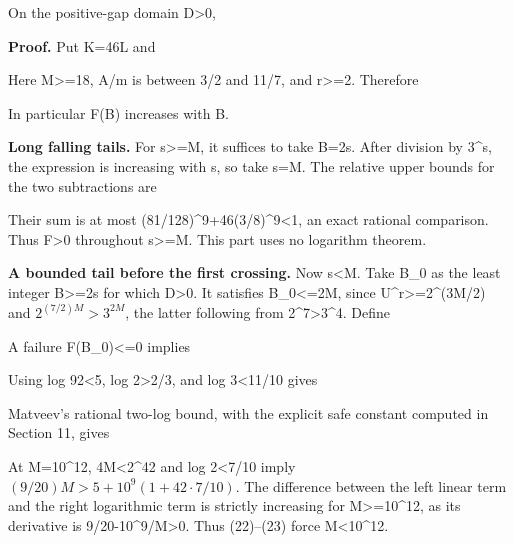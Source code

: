 On the positive-gap domain D\textgreater0,


\textbf{Proof.} Put K=46L and


Here M\textgreater=18, A/m is between 3/2 and 11/7, and r\textgreater=2.
Therefore


In particular F(B) increases with B.

\textbf{Long falling tails.} For s\textgreater=M, it suffices to take
B=2s. After division by 3\^{}s, the expression is increasing with s, so
take s=M. The relative upper bounds for the two subtractions are


Their sum is at most (81/128)\^{}9+46(3/8)\^{}9\textless1, an exact
rational comparison. Thus F\textgreater0 throughout s\textgreater=M.
This part uses no logarithm theorem.

\textbf{A bounded tail before the first crossing.} Now s\textless M.
Take B\_0 as the least integer B\textgreater=2s for which
D\textgreater0. It satisfies B\_0\textless=2M, since
U\^{}r\textgreater=2\^{}(3M/2) and \(2^{(7/2)M}>3^{2M}\), the latter
following from 2\^{}7\textgreater3\^{}4. Define


A failure F(B\_0)\textless=0 implies


Using log 92\textless5, log 2\textgreater2/3, and log 3\textless11/10
gives


Matveev's rational two-log bound, with the explicit safe constant
computed in Section 11, gives


At M=10\^{}12, 4M\textless2\^{}42 and log 2\textless7/10 imply
\((9/20)M>5+10^9(1+42\cdot7/10)\). The difference between the left
linear term and the right logarithmic term is strictly increasing for
M\textgreater=10\^{}12, as its derivative is
9/20-10\^{}9/M\textgreater0. Thus (22)--(23) force M\textless10\^{}12.

